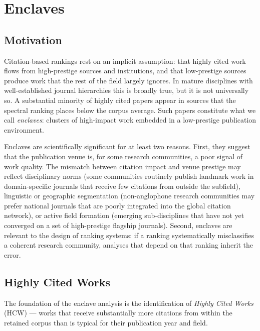 \section{Enclaves}
\label{sec:enclaves}

\subsection{Motivation}

Citation-based rankings rest on an implicit assumption: that highly cited work
flows from high-prestige sources and institutions, and that low-prestige
sources produce work that the rest of the field largely ignores.  In mature
disciplines with well-established journal hierarchies this is broadly true, but
it is not universally so.  A substantial minority of highly cited papers appear
in sources that the spectral ranking places below the corpus average.  Such
papers constitute what we call \emph{enclaves}: clusters of high-impact work
embedded in a low-prestige publication environment.

Enclaves are scientifically significant for at least two reasons.  First, they
suggest that the publication venue is, for some research communities, a poor
signal of work quality.  The mismatch between citation impact and venue prestige
may reflect disciplinary norms (some communities routinely publish landmark
work in domain-specific journals that receive few citations from outside the
subfield), linguistic or geographic segmentation (non-anglophone research
communities may prefer national journals that are poorly integrated into the
global citation network), or active field formation (emerging sub-disciplines
that have not yet converged on a set of high-prestige flagship journals).
Second, enclaves are relevant to the design of ranking systems: if a ranking
systematically misclassifies a coherent research community, analyses that
depend on that ranking inherit the error.

\subsection{Highly Cited Works}

The foundation of the enclave analysis is the identification of
\emph{Highly Cited Works} (HCW) — works that receive substantially more
citations from within the retained corpus than is typical for their publication
year and field.

